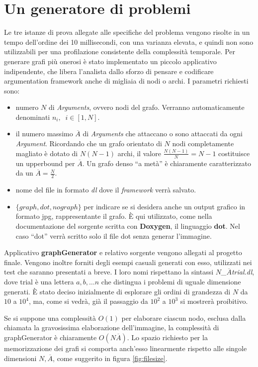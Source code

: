 \section{Un generatore di problemi} \label{sec:graphgen}
Le tre istanze di prova allegate alle specifiche del problema vengono risolte in
un tempo dell'ordine dei 10 millisecondi, con una varianza elevata, e quindi non
sono utilizzabili per una profilazione consistente della complessità temporale.
Per generare grafi più onerosi è stato implementato un piccolo applicativo
indipendente, che libera l'analista dallo sforzo di pensare e codificare
argumentation framework anche di migliaia di nodi o archi.
I parametri richiesti sono:
\begin{itemize}
  \item numero $N$ di \emph{Arguments}, ovvero nodi del grafo. Verranno
  automaticamente denominati $n_i,\;\; i\in[1,N]$.
  \item il numero massimo $\overline{A}$ di \emph{Arguments} che attaccano o
  sono attaccati da ogni \emph{Argument}. Ricordando che un grafo orientato di $N$
  nodi completamente magliato è dotato di $N(N-1)$ archi, il valore
  $\frac{N(N-1)}{N} = N-1$ costituisce un upperbound per $\overline{A}$. Un
  grafo denso ``a metà'' è chiaramente caratterizzato da un $\overline{A} =
  \frac{N}{2}$.
  \item nome del file in formato \emph{dl} dove il \emph{framework} verrà
  salvato.
  \item $\{graph, dot, nograph\}$ per indicare se si desidera anche un
  output grafico in formato jpg, rappresentante il grafo. È qui utilizzato, come
  nella documentazione del sorgente scritta con \textbf{Doxygen}, il linguaggio
  \textbf{dot}. Nel caso ``dot'' verrà scritto solo il file dot senza generar
  l'immagine.
\end{itemize}

Applicativo \textbf{graphGenerator} e relativo sorgente vengono allegati al
progetto finale. Vengono inoltre forniti degli esempi casuali generati con
esso, utilizzati nei test che saranno presentati a breve. I loro nomi rispettano
la sintassi $N$\emph{\_}$\overline{A}$\emph{trial.dl}, dove trial è una lettera
$a,b,\ldots n$ che distingua i problemi di uguale dimensione generati.
È stato deciso inizialmente di esplorare gli ordini di grandezza di $N$ da $10$ a $10^4$, ma, come si vedrà,
già il passaggio da $10^2$ a $10^3$ si mostrerà proibitivo.

 Se si suppone una complessità $O(1)$
per elaborare ciascun nodo, esclusa dalla chiamata la gravosissima elaborazione dell'immagine, la complessità di graphGenerator è
chiaramente $O(N\overline{A})$. Lo spazio richiesto per la memorizzazione dei
grafi si comporta anch'esso linearmente rispetto alle singole dimensioni $N,
\overline{A}$, come suggerito in figura \ref{fig:filesize}.

